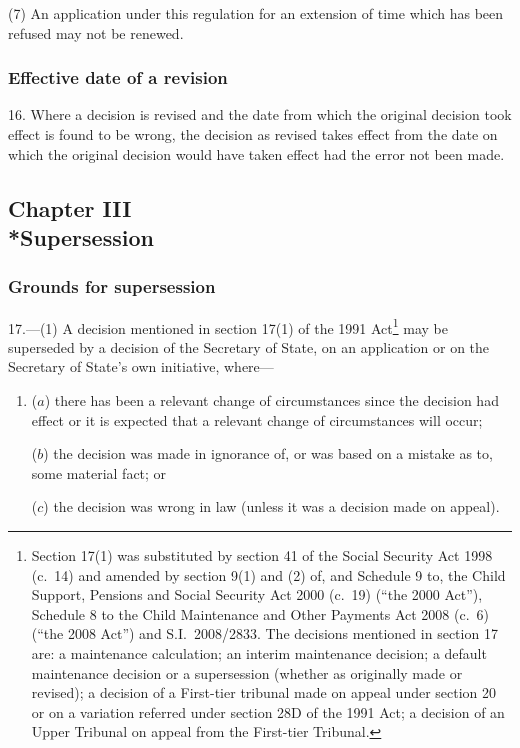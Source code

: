 \documentclass[12pt,a4paper]{article}
\begin{document}
(7) An application under this regulation for an extension of time which has been refused may not be renewed.


\subsubsection[16. Effective date of a revision]{Effective date of a revision}

16.  Where a decision is revised and the date from which the original decision took effect is found to be wrong, the decision as revised takes effect from the date on which the original decision would have taken effect had the error not been made.

\subsection[Chapter III --- Supersession]{Chapter III\\*Supersession}

\renewcommand\parthead{--- Part III Chapter III}

\subsubsection[17. Grounds for supersession]{Grounds for supersession}

17.---(1)  A decision mentioned in section 17(1) of the 1991 Act\footnote{Section 17(1) was substituted by section 41 of the Social Security Act 1998 (c.~14) and amended by section 9(1) and (2) of, and Schedule 9 to, the Child Support, Pensions and Social Security Act 2000 (c.~19) (“the 2000 Act”), Schedule 8 to the Child Maintenance and Other Payments Act 2008 (c.~6) (“the 2008 Act”) and S.I.~2008/2833. The decisions mentioned in section 17 are: a maintenance calculation; an interim maintenance decision; a default maintenance decision or a supersession (whether as originally made or revised); a decision of a First-tier tribunal made on appeal under section 20 or on a variation referred under section 28D of the 1991 Act; a decision of an Upper Tribunal on appeal from the First-tier Tribunal.} may be superseded by a decision of the Secretary of State, on an application or on the Secretary of State’s own initiative, where—
\begin{enumerate}\item[]
($a$) there has been a relevant change of circumstances since the decision had effect or it is expected that a relevant change of circumstances will occur;

($b$) the decision was made in ignorance of, or was based on a mistake as to, some material fact; or

($c$) the decision was wrong in law (unless it was a decision made on appeal).
\end{enumerate}
\end{document}
